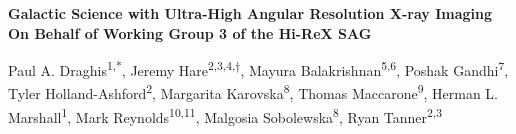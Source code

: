 \documentclass{article}
\begin{document}

\begin{center}
    \vspace*{-1cm}
      \huge\textbf{Galactic Science with Ultra-High Angular Resolution X-ray Imaging}\\
      \Large\textbf{On Behalf of Working Group 3 of the Hi-ReX SAG}
    \vspace*{0.3cm}
  \end{center}  
    
    \large
    \noindent
    Paul A. Draghis\textsuperscript{1,*}, 
    Jeremy Hare\textsuperscript{2,3,4,$\dagger$}, 
    Mayura Balakrishnan\textsuperscript{5,6},  
    Poshak Gandhi\textsuperscript{7}, 
    Tyler Holland-Ashford\textsuperscript{2}, 
    Margarita Karovska\textsuperscript{8}, 
    Thomas Maccarone\textsuperscript{9}, 
    Herman L. Marshall\textsuperscript{1}, 
    Mark Reynolds\textsuperscript{10,11}, 
    Malgosia Sobolewska\textsuperscript{8}, 
    Ryan Tanner\textsuperscript{2,3}
    \vspace*{0.3cm}
    
    
\end{document}
